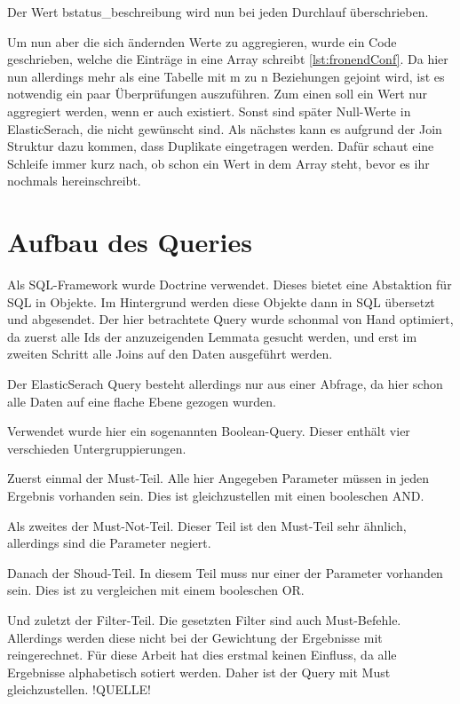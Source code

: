 Der Wert bstatus\_beschreibung wird nun bei jeden Durchlauf überschrieben. 

Um nun aber die sich ändernden Werte zu aggregieren, wurde ein Code geschrieben, welche die Einträge in eine Array schreibt \ref{lst:fronendConf}. Da hier nun allerdings mehr als eine Tabelle mit m zu n Beziehungen gejoint wird, ist es notwendig ein paar Überprüfungen auszuführen. Zum einen soll ein Wert nur aggregiert werden, wenn er auch existiert. Sonst sind später Null-Werte in ElasticSerach, die nicht gewünscht sind. Als nächstes kann es aufgrund der Join Struktur dazu kommen, dass Duplikate eingetragen werden. Dafür schaut eine Schleife immer kurz nach, ob schon ein Wert in dem Array steht, bevor es ihr nochmals hereinschreibt. 

\section{Aufbau des Queries}

Als SQL-Framework wurde Doctrine verwendet. Dieses bietet eine Abstaktion für SQL in Objekte. Im Hintergrund werden diese Objekte dann in SQL übersetzt und abgesendet. Der hier betrachtete Query wurde schonmal von Hand optimiert, da zuerst alle Ids der anzuzeigenden Lemmata gesucht werden, und erst im zweiten Schritt alle Joins auf den Daten ausgeführt werden.

Der ElasticSerach Query besteht allerdings nur aus einer Abfrage, da hier schon alle Daten auf eine flache Ebene gezogen wurden.

Verwendet wurde hier ein sogenannten Boolean-Query. Dieser enthält vier verschieden Untergruppierungen.

Zuerst einmal der Must-Teil. Alle hier Angegeben Parameter müssen in jeden Ergebnis vorhanden sein. Dies ist gleichzustellen mit einen booleschen AND. 

Als zweites der Must-Not-Teil. Dieser Teil ist den Must-Teil sehr ähnlich, allerdings sind die Parameter negiert.

Danach der Shoud-Teil. In diesem Teil muss nur einer der Parameter vorhanden sein. Dies ist zu vergleichen mit einem booleschen OR. 

Und zuletzt der Filter-Teil. Die gesetzten Filter sind auch Must-Befehle. Allerdings werden diese nicht bei der Gewichtung der Ergebnisse mit reingerechnet. Für diese Arbeit hat dies erstmal keinen Einfluss, da alle Ergebnisse alphabetisch sotiert werden. Daher ist der Query mit Must gleichzustellen. !QUELLE!



